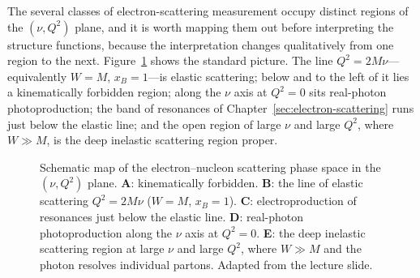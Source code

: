 The several classes of electron-scattering measurement occupy distinct regions of the
$(\nu,Q^{2})$ plane, and it is worth mapping them out before interpreting the structure
functions, because the interpretation changes qualitatively from one region to the next.
Figure~\ref{fig:dis-phase-space} shows the standard picture. The line
$Q^{2}=2M\nu$---equivalently $W=M$, $x_{B}=1$---is elastic scattering; below and to the
left of it lies a kinematically forbidden region; along the $\nu$ axis at $Q^{2}=0$ sits
real-photon photoproduction; the band of resonances of
Chapter~\ref{sec:electron-scattering} runs just below the elastic line; and the open
region of large $\nu$ and large $Q^{2}$, where $W\gg M$, is the deep inelastic
scattering region proper.

\begin{figure}[htbp]
    \centering
    \caption{Schematic map of the electron--nucleon scattering phase space in the
             $(\nu,Q^{2})$ plane. \textbf{A}: kinematically forbidden.
             \textbf{B}: the line of elastic scattering $Q^{2}=2M\nu$ ($W=M$,
             $x_{B}=1$). \textbf{C}: electroproduction of resonances just below
             the elastic line. \textbf{D}: real-photon photoproduction along the
             $\nu$ axis at $Q^{2}=0$. \textbf{E}: the deep inelastic scattering
             region at large $\nu$ and large $Q^{2}$, where $W\gg M$ and the
             photon resolves individual partons. Adapted from the lecture slide.}
    \label{fig:dis-phase-space}
\end{figure}

